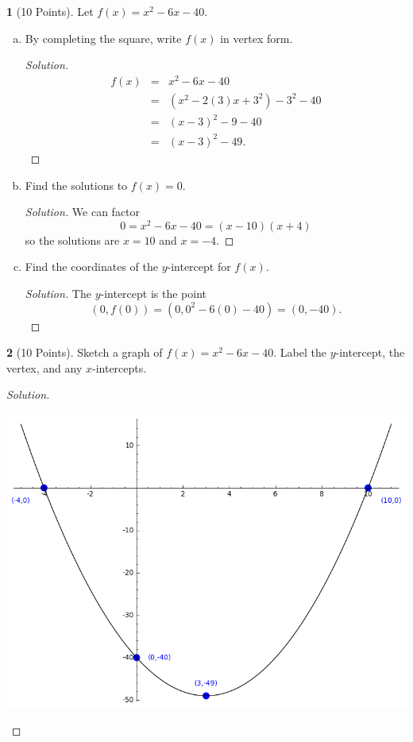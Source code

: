 \documentclass[12pt]{amsart}
\theoremstyle{definition}
\newtheorem{thm}{}
\begin{document}
\begin{thm}[10 Points]
  Let $f(x) = x^2 - 6x - 40$.
  \begin{enumerate}[(a)]
  \item
    By completing the square, write $f(x)$ in vertex form.
    \begin{proof}[Solution]
      \begin{eqnarray*}
        f(x) &=& x^2 - 6x - 40\\
        &=& (x^2 - 2(3)x + 3^2) - 3^2 - 40\\
        &=& (x - 3)^2 - 9 - 40\\
        &=& (x - 3)^2 - 49.
      \end{eqnarray*}
    \end{proof}
  \item
    Find the solutions to $f(x) = 0$.
    \begin{proof}[Solution]
      We can factor
      $$0 = x^2 - 6x - 40 = (x - 10)(x + 4)$$
      so the solutions are $x = 10$ and $x = -4$.
    \end{proof}
  \item
    Find the coordinates of the $y$-intercept for $f(x)$.
    \begin{proof}[Solution]
      The $y$-intercept is the point
      $$(0,f(0)) = (0, 0^2 - 6(0) - 40) = (0, -40).$$
    \end{proof}
  \end{enumerate}
\end{thm}

\begin{thm}[10 Points]
  Sketch a graph of $f(x) = x^2 - 6x - 40.$
  Label the $y$-intercept, the vertex, and any $x$-intercepts.
\end{thm}
\begin{proof}[Solution]\hfill\\
  
  \begin{center}
    \includegraphics[scale=0.8]{parabola}
  \end{center}
\end{proof}
\end{document}
